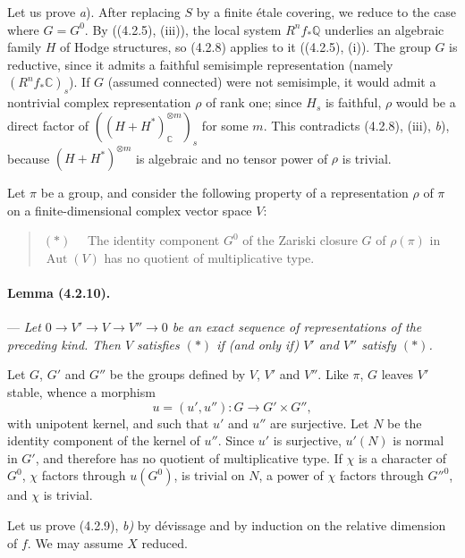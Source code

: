 \documentclass[10pt]{article}
\newcommand{\C}{\mathbb C}
\newcommand{\Q}{\mathbb Q}
\providecommand{\Aut}{\operatorname{Aut}}
\begin{document}
Let us prove \textit{a}). After replacing $S$ by a finite étale covering, we reduce to the case where $G=G^0$. By ((4.2.5), (iii)), the local system $R^nf_*\Q$ underlies an algebraic family $H$ of Hodge structures, so (4.2.8) applies to it ((4.2.5), (i)). The group $G$ is reductive, since it admits a faithful semisimple representation (namely $(R^nf_*\C)_s$). If $G$ (assumed connected) were not semisimple, it would admit a nontrivial complex representation $\rho$ of rank one; since $H_s$ is faithful, $\rho$ would be a direct factor of $((H+H^*)_\C^{\otimes m})_s$ for some $m$. This contradicts (4.2.8), (iii), \textit{b}), because $(H+H^*)^{\otimes m}$ is algebraic and no tensor power of $\rho$ is trivial.

Let $\pi$ be a group, and consider the following property of a representation $\rho$ of $\pi$ on a finite-dimensional complex vector space $V$:
\begin{quote}
\noindent $(*)\quad$ The identity component $G^0$ of the Zariski closure $G$ of $\rho(\pi)$ in $\Aut(V)$ has no quotient of multiplicative type.
\end{quote}

\paragraph{Lemma (4.2.10).} --- {\itshape Let $0\to V'\to V\to V''\to0$ be an exact sequence of representations of the preceding kind. Then $V$ satisfies $(*)$ if (and only if) $V'$ and $V''$ satisfy $(*)$.}

Let $G$, $G'$ and $G''$ be the groups defined by $V$, $V'$ and $V''$. Like $\pi$, $G$ leaves $V'$ stable, whence a morphism
\[
u=(u',u''):G\longrightarrow G'\times G'',
\]
with unipotent kernel, and such that $u'$ and $u''$ are surjective. Let $N$ be the identity component of the kernel of $u''$. Since $u'$ is surjective, $u'(N)$ is normal in $G'$, and therefore has no
quotient of multiplicative type. If $\chi$ is a character of $G^0$, $\chi$ factors through $u(G^0)$, is trivial on $N$, a power of $\chi$ factors through $G''^0$, and $\chi$ is trivial.

Let us prove (4.2.9), \textit{b)} by dévissage and by induction on the relative dimension of $f$. We may assume $X$ reduced.
\end{document}

